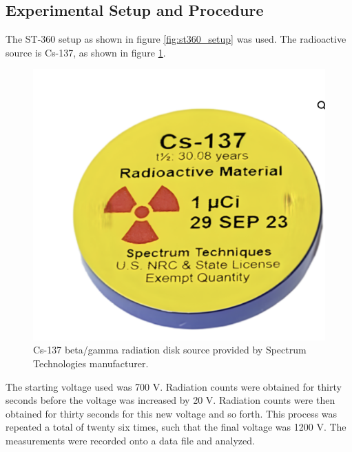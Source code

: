 \documentclass[reprint,amsmath,amssymb,aps,prl]{revtex4-2}
\begin{document}
\subsection{Experimental Setup and Procedure}
The ST-360 setup as shown in figure \ref{fig:st360_setup} was used. The radioactive source is Cs-137, as shown in figure \ref{fig: cs137}. 
\begin{figure}
    \centering
    \includegraphics[scale = 0.1]{cs137.png}
    \caption{Cs-137 beta/gamma radiation disk source provided by Spectrum Technologies manufacturer.}
    \label{fig: cs137}
\end{figure}
The starting voltage used was 700 V. Radiation counts were obtained for thirty seconds before the voltage was increased by 20 V. Radiation counts were then obtained for thirty seconds for this new voltage and so forth. This process was repeated a total of twenty six times, such that the final voltage was 1200 V. The measurements were recorded onto a data file and analyzed. 
\end{document}
